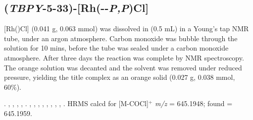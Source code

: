 %
%
%
%


\subsection*{(\emph{TBPY}-5-33)-[Rh(\tBusixantphos--\emph{P,P}\textprime)Cl]}



[Rh(\tBusixantphos)Cl] (0.041 g, 0.063 mmol) was dissolved in  (0.5 mL) in a Young's tap NMR tube, under an argon atmosphere.  Carbon monoxide was bubble through the solution for 10 mins, before the tube was sealed under a carbon monoxide atmosphere.  After three days the reaction was complete by \phosphorus{} NMR spectroscopy.  The orange solution was decanted and the solvent was removed under reduced pressure, yielding the title complex as an orange solid (0.027 g, 0.038 mmol, 60\%). 

.
,
,
,
,
.
,
,
,
,
,
,
,
,
.
HRMS calcd for  [M-COCl]$^+$ \emph{m/z} = 645.1948; found = 645.1959.


